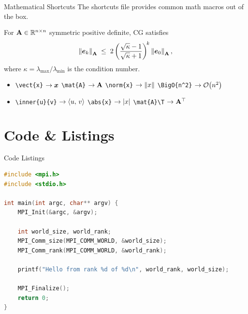 \documentclass[aspectratio=169]{beamer}
\begin{document}
\begin{frame}{Mathematical Shortcuts}
  The shortcuts file provides common math macros out of the box.

  \vspace{0.4em}
    For $\mathbf{A} \in \mathbb{R}^{n \times n}$ symmetric positive definite,
    CG satisfies
    \[
      \left\lVert\boldsymbol{e}_k\right\rVert_{\mathbf{A}}
        \;\leq\;
      2\left(\frac{\sqrt{\kappa}-1}{\sqrt{\kappa}+1}\right)^{\!k}
      \left\lVert\boldsymbol{e}_0\right\rVert_{\mathbf{A}},
    \]
    where $\kappa = \lambda_{\max}/\lambda_{\min}$ is the condition number.
  \theoremend

  \vspace{0.3em}
  \begin{itemize}
    \item \texttt{\textbackslash vect\{x\}} $\to \boldsymbol{x}$ \quad
          \texttt{\textbackslash mat\{A\}}  $\to \mathbf{A}$ \quad
          \texttt{\textbackslash norm\{x\}} $\to \left\lVert x\right\rVert$ \quad
          \texttt{\textbackslash BigO\{n\^{}2\}} $\to \mathcal{O}\!\left(n^2\right)$
    \item \texttt{\textbackslash inner\{u\}\{v\}} $\to \langle u,\, v \rangle$ \quad
          \texttt{\textbackslash abs\{x\}} $\to \left|x\right|$ \quad
          \texttt{\textbackslash mat\{A\}\textbackslash T} $\to \mathbf{A}^{\top}$
  \end{itemize}
\end{frame}

\section{Code \& Listings}

\horixonhidesepline

\begin{frame}[fragile]{Code Listings}
  \begin{lstlisting}[language=C, caption={MPI Hello World}]
#include <mpi.h>
#include <stdio.h>

int main(int argc, char** argv) {
    MPI_Init(&argc, &argv);

    int world_size, world_rank;
    MPI_Comm_size(MPI_COMM_WORLD, &world_size);
    MPI_Comm_rank(MPI_COMM_WORLD, &world_rank);

    printf("Hello from rank %d of %d\n", world_rank, world_size);

    MPI_Finalize();
    return 0;
}
  \end{lstlisting}
\end{frame}
\end{document}
